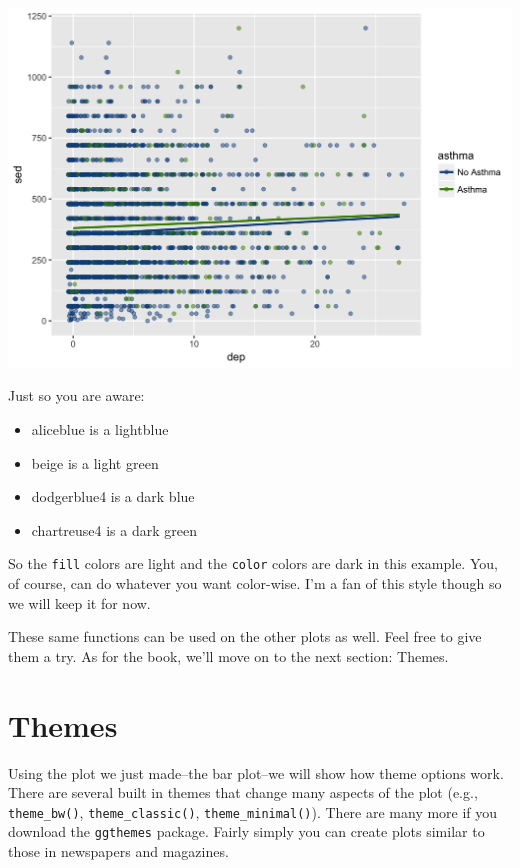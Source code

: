\documentclass[]{tufte-book}
\providecommand{\tightlist}{%
  \setlength{\itemsep}{0pt}\setlength{\parskip}{0pt}}
\theoremstyle{definition}
\theoremstyle{definition}
\theoremstyle{remark}
\begin{document}
\includegraphics{_main_files/figure-latex/unnamed-chunk-144-1}

Just so you are aware:

\begin{itemize}
\tightlist
\item
  aliceblue is a lightblue
\item
  beige is a light green
\item
  dodgerblue4 is a dark blue
\item
  chartreuse4 is a dark green
\end{itemize}

So the \texttt{fill} colors are light and the \texttt{color} colors are
dark in this example. You, of course, can do whatever you want
color-wise. I'm a fan of this style though so we will keep it for now.

These same functions can be used on the other plots as well. Feel free
to give them a try. As for the book, we'll move on to the next section:
Themes.

\section*{Themes}\label{themes}

Using the plot we just made--the bar plot--we will show how theme
options work. There are several built in themes that change many aspects
of the plot (e.g., \texttt{theme\_bw()}, \texttt{theme\_classic()},
\texttt{theme\_minimal()}). There are many more if you download the
\texttt{ggthemes} package. Fairly simply you can create plots similar to
those in newspapers and magazines.
\end{document}

